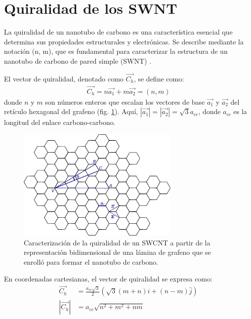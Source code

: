 \documentclass[a4paper]{article}
\begin{document}
\section{Quiralidad de los SWNT}

La quiralidad de un nanotubo de carbono es una característica esencial que determina sus propiedades estructurales y electrónicas. Se describe mediante la notación (n, m), que es fundamental para caracterizar la estructura de un nanotubo de carbono de pared simple (SWNT) \cite{avila2008molecular}.

El vector de quiralidad, denotado como \(\vec{C_h}\), se define como:
\begin{align}
    \vec{C_h} = n\vec{a_1} + m \vec{a_2} = (n, m)
\end{align} 
donde \(n\) y \(m\) son números enteros que escalan los vectores de base \(\vec{a_1}\) y \(\vec{a_2}\) del retículo hexagonal del grafeno (fig. \ref{fig:quiralidad}). Aquí, \( |\vec{a_1}| = |\vec{a_2}| = \sqrt{3} a_{cc} \), donde \(a_{cc}\) es la longitud del enlace carbono-carbono. 

\begin{figure}[h!]
\centering
\includegraphics[width=0.7\textwidth]{images/panal1.png}
\caption{Caracterización de la quiralidad de un SWCNT a partir de la representación bidimensional de una lámina de grafeno que se enrolló para formar el nanotubo de carbono.}
\label{fig:quiralidad}
\end{figure}
En coordenadas cartesianas, el vector de quiralidad se expresa como:
\begin{align}
    \vec{C_h} &= \frac{a_{cc}\sqrt{3}}{2}(\sqrt{3}(m+n)\hat{i} + (n-m)\hat{j}) \\
     |\vec{C_h}| &= a_{cc}\sqrt{n^2 + m^2 + nm} 
\end{align}
\end{document}
